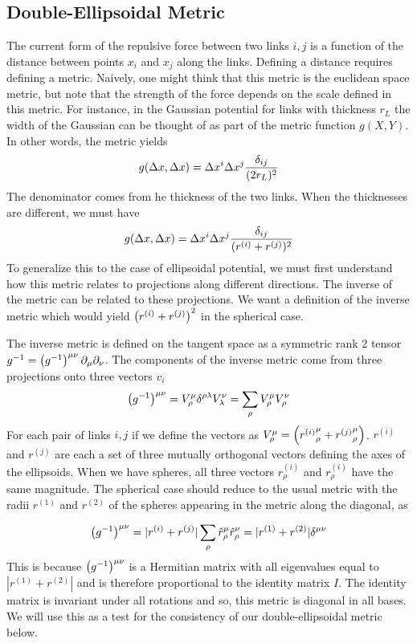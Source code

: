 \documentclass[nofootinbib,preprint,floatfix,titlepage,endfloats,superscriptaddress]{revtex4} %
\begin{document}
\subsection{Double-Ellipsoidal Metric }
The current form of the repulsive force between two links $i,j$ is a function of the distance between points $x_i$ and $x_j$ along the links. 
Defining a distance requires defining a metric. 
Naively, one might think that this metric is the euclidean space metric, but note that the strength of the force depends on the scale defined in this metric. 
For instance, in the Gaussian potential for links with thickness $r_L$ the width of the Gaussian can be thought of as part of the metric function $g(X,Y)$. 
In other words, the metric yields
\[g(\Delta x, \Delta x) = \Delta x^i \Delta x^j {\delta_{ij} \over (2 r_L)^2}  \]
The denominator comes from he thickness of the two links. When the thicknesses are different, we must have
\[g(\Delta x, \Delta x) = \Delta x^i \Delta x^j {\delta_{ij} \over ( r^{(i)} +r^{(j)})^2}  \]
To generalize this to the case of ellipsoidal potential, we must first understand how this metric relates to projections along different directions. 
The inverse of the metric can be related to these projections. 
We want a definition of the inverse metric which would yield $\left(r^{(i)} +r^{(j)}\right)^2$ in the spherical case. 

The inverse metric is defined on the tangent space as a symmetric rank 2 tensor $ g^{-1} = \left(g^{-1}\right)^{\mu\nu}\partial_\mu \partial_\nu $. 
The components of the inverse metric  come from three projections onto three vectors $v_i$
\begin{equation}
    \left(g^{-1}\right)^{\mu\nu} = V^\mu_\rho \delta^{\rho \lambda} V^\nu_\lambda =  \sum_{\rho} V_\rho^\mu V_\rho^\nu \label{eq:ginv}
\end{equation}
For each pair of links $i,j$ if we define the vectors as $V_\rho^\mu =%
\pr{{r^{(i)}}_{\rho}^\mu+{r^{(j)}}_{\rho}^\mu} $. 
$r^{(i)}$ and $r^{(j)}$ are each a set of three mutually orthogonal vectors defining the axes of the ellipsoids. 
When we have spheres, all three vectors $r^{(i)}_\rho$ and $r^{(i)}_\rho$ have the same magnitude. 
The spherical case should reduce to the usual metric with the radii $r^{(1)}$ and $r^{(2)}$ of the spheres appearing in the metric along the diagonal, as 

$$ \left(g^{-1}\right)^{\mu\nu} = |r^{(i)}+r^{(j)}|\sum_{\rho} \hat{r}_\rho^\mu \hat{r}_\rho^\nu = |r^{(1)}+r^{(2)}| \delta^{\mu\nu }$$
This is because $ \left(g^{-1}\right)^{\mu\nu} $ is a Hermitian matrix with all eigenvalues equal to $|r^{(1)}+r^{(2)}|$ and is therefore proportional to the identity matrix $I$. The identity matrix is invariant under all rotations and so, this metric is diagonal in all bases.
We will use this as a test for the consistency of our double-ellipsoidal metric below. 
 
\end{document}
